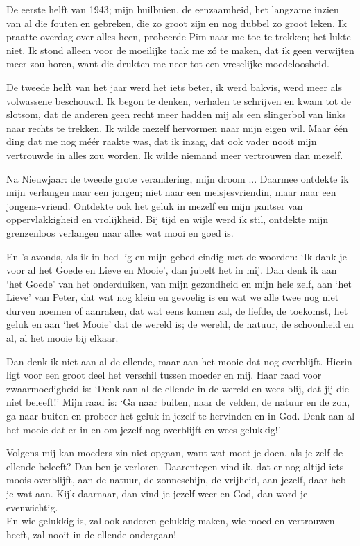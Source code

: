\documentclass{book}
\begin{document}
De eerste helft van 1943; mijn huilbuien, de eenzaamheid, het langzame
inzien van al die fouten en gebreken, die zo groot zijn en nog dubbel zo
groot leken. Ik praatte overdag over alles heen, probeerde Pim naar me
toe te trekken; het lukte niet. Ik stond alleen voor de moeilijke taak
me zó te maken, dat ik geen verwijten meer zou horen, want die drukten
me neer tot een vreselijke moedeloosheid.

De tweede helft van het jaar werd het iets beter, ik werd bakvis, werd
meer als volwassene beschouwd. Ik begon te denken, verhalen te schrijven
en kwam tot de slotsom, dat de anderen geen recht meer hadden mij als
een slingerbol van links naar rechts te trekken. Ik wilde mezelf
hervormen naar mijn eigen wil. Maar één ding dat me nog méér raakte was,
dat ik inzag, dat ook vader nooit mijn vertrouwde in alles zou worden.
Ik wilde niemand meer vertrouwen dan mezelf.

Na Nieuwjaar: de tweede grote verandering, mijn droom ... Daarmee
ontdekte ik mijn verlangen naar een jongen; niet naar een
meisjesvriendin, maar naar een jongens-vriend. Ontdekte ook het geluk in
mezelf en mijn pantser van oppervlakkigheid en vrolijkheid. Bij tijd en
wijle werd ik stil, ontdekte mijn grenzenloos verlangen naar alles wat
mooi en goed is.

En 's avonds, als ik in bed lig en mijn gebed eindig met de woorden: `Ik
dank je voor al het Goede en Lieve en Mooie', dan jubelt het in mij. Dan
denk ik aan `het Goede' van het onderduiken, van mijn gezondheid en mijn
hele zelf, aan `het Lieve' van Peter, dat wat nog klein en gevoelig is
en wat we alle twee nog niet durven noemen of aanraken, dat wat eens
komen zal, de liefde, de toekomst, het geluk en aan `het Mooie' dat de
wereld is; de wereld, de natuur, de schoonheid en al, al het mooie bij
elkaar.

Dan denk ik niet aan al de ellende, maar aan het mooie dat nog
overblijft. Hierin ligt voor een groot deel het verschil tussen moeder
en mij. Haar raad voor zwaarmoedigheid is: `Denk aan al de ellende in de
wereld en wees blij, dat jij die niet beleeft!' Mijn raad is: `Ga naar
buiten, naar de velden, de natuur en de zon, ga naar buiten en probeer
het geluk in jezelf te hervinden en in God. Denk aan al het mooie dat er
in en om jezelf nog overblijft en wees gelukkig!'

Volgens mij kan moeders zin niet opgaan, want wat moet je doen, als je
zelf de ellende beleeft? Dan ben je verloren. Daarentegen vind ik, dat
er nog altijd iets moois overblijft, aan de natuur, de zonneschijn, de
vrijheid, aan jezelf, daar heb je wat aan. Kijk daarnaar, dan vind je
jezelf weer en God, dan word je evenwichtig.\\En wie gelukkig is, zal
ook anderen gelukkig maken, wie moed en vertrouwen heeft, zal nooit in
de ellende ondergaan!
\end{document}
